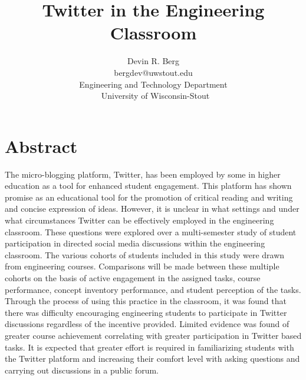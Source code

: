 \documentclass[12pt]{article}
\title{\large \textbf{Twitter in the Engineering Classroom}} %
\author{\vspace{-5ex}}
\author{\normalsize Devin R. Berg\\
\normalsize bergdev@uwstout.edu\\
\normalsize Engineering and Technology Department\\\
\normalsize University of Wisconsin-Stout}
\date{\vspace{-5ex}} %
\begin{document}
\raggedright
\maketitle
\thispagestyle{empty}
\pagestyle{empty}

\section*{Abstract}
The micro-blogging platform, Twitter, has been employed by some in higher education as a tool for enhanced student engagement. This platform has shown promise as an educational tool for the promotion of critical reading and writing and concise expression of ideas. However, it is unclear in what settings and under what circumstances Twitter can be effectively employed in the engineering classroom. These questions were explored over a multi-semester study of student participation in directed social media discussions within the engineering classroom. The various cohorts of students included in this study were drawn from engineering courses. Comparisons will be made between these multiple cohorts on the basis of active engagement in the assigned tasks, course performance, concept inventory performance, and student perception of the tasks. Through the process of using this practice in the classroom, it was found that there was difficulty encouraging engineering students to participate in Twitter discussions regardless of the incentive provided. Limited evidence was found of greater course achievement correlating with greater participation in Twitter based tasks. It is expected that greater effort is required in familiarizing students with the Twitter platform and increasing their comfort level with asking questions and carrying out discussions in a public forum.
\end{document}
